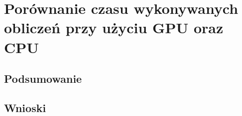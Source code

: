 \chapter{Porównanie czasu wykonywanych obliczeń przy użyciu GPU oraz CPU}

\section{Podsumowanie}

\section{Wnioski}